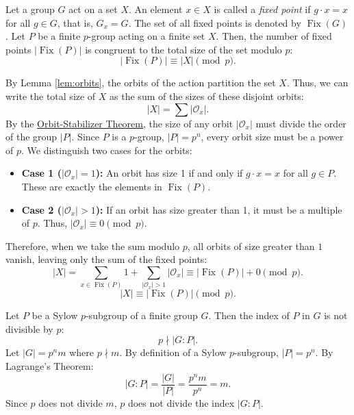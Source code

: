 \documentclass[a4paper,12pt]{article}
\begin{document}
{
   Let a group $G$ act on a set $X$. An element $x \in X$ is called a \textit{fixed point} if $g \cdot x = x$ for all $g \in G$, that is, $G_x = G$. The set of all fixed points is denoted by $\operatorname{Fix}(G)$.
}
{
    Let $P$ be a finite $p$-group acting on a finite set $X$. Then, the number of fixed points $|\operatorname{Fix}(P)|$ is congruent to the total size of the set modulo $p$:
    \[ |\operatorname{Fix}(P)| \equiv |X| \pmod p. \]
}
{
    By Lemma \ref{lem:orbits}, the orbits of the action partition the set $X$. Thus, we can write the total size of $X$ as the sum of the sizes of these disjoint orbits:
    \[ |X| = \sum |\mathcal{O}_x|. \]
    By the \hyperref[thm:orbit_stabilizer]{Orbit-Stabilizer Theorem}, the size of any orbit $|\mathcal{O}_x|$ must divide the order of the group $|P|$. Since $P$ is a $p$-group, $|P| = p^n$, every orbit size must be a power of $p$.
    We distinguish two cases for the orbits:
    \begin{itemize}
        \item \textbf{Case 1 ($|\mathcal{O}_x| = 1$):} An orbit has size 1 if and only if $g \cdot x = x$ for all $g \in P$. These are exactly the elements in $\operatorname{Fix}(P)$.
        \item \textbf{Case 2 ($|\mathcal{O}_x| > 1$):} If an orbit has size greater than 1, it must be a multiple of $p$. Thus, $|\mathcal{O}_x| \equiv 0 \pmod p$.
    \end{itemize}
    Therefore, when we take the sum modulo $p$, all orbits of size greater than $1$ vanish, leaving only the sum of the fixed points:
    \[ |X| = \sum_{x \in \operatorname{Fix}(P)} 1 + \sum_{|\mathcal{O}_x| > 1} |\mathcal{O}_x| \equiv |\operatorname{Fix}(P)| + 0 \pmod p. \]
    \[ |X| \equiv |\operatorname{Fix}(P)| \pmod p.\]
}
{
    Let $P$ be a Sylow $p$-subgroup of a finite group $G$. Then the index of $P$ in $G$ is not divisible by $p$:
    \[ p \nmid |G:P|. \]
}
{
    Let $|G| = p^n m$ where $p \nmid m$. By definition of a Sylow $p$-subgroup, $|P| = p^n$. By Lagrange's Theorem:
    \[ |G:P| = \frac{|G|}{|P|} = \frac{p^n m}{p^n} = m. \]
    Since $p$ does not divide $m$, $p$ does not divide the index $|G:P|$.
}
\end{document}
